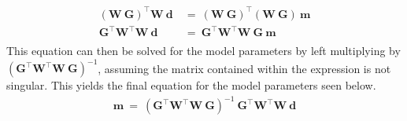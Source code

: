 \documentclass[12pt,runningheads]{article}
\begin{document}
\begin{align*}
(\textbf{W}\ \textbf{G})^{\intercal}\textbf{W}\ \textbf{d}\ &=\ (\textbf{W}\ \textbf{G})^{\intercal}(\textbf{W}\ \textbf{G})\ \textbf{m}\\
\textbf{G}^{\intercal}\textbf{W}^{\intercal}\textbf{W}\ \textbf{d}\ &=\  \textbf{G}^{\intercal}\textbf{W}^{\intercal}\textbf{W}\ \textbf{G}\ \textbf{m} \\
\end{align*}
This equation can then be solved for the model parameters by left multiplying by $(\textbf{G}^{\intercal}\textbf{W}^{\intercal}\textbf{W}\ \textbf{G})^{-1}$, assuming the matrix contained within the expression is not singular. This yields the final equation for the model parameters seen below.\\
\begin{align*}
\textbf{m}\ =\ (\textbf{G}^{\intercal}\textbf{W}^{\intercal}\textbf{W}\ \textbf{G})^{-1}\ \textbf{G}^{\intercal}\textbf{W}^{\intercal}\textbf{W}\ \textbf{d} \\
\end{align*}
\pagebreak
\end{document}
